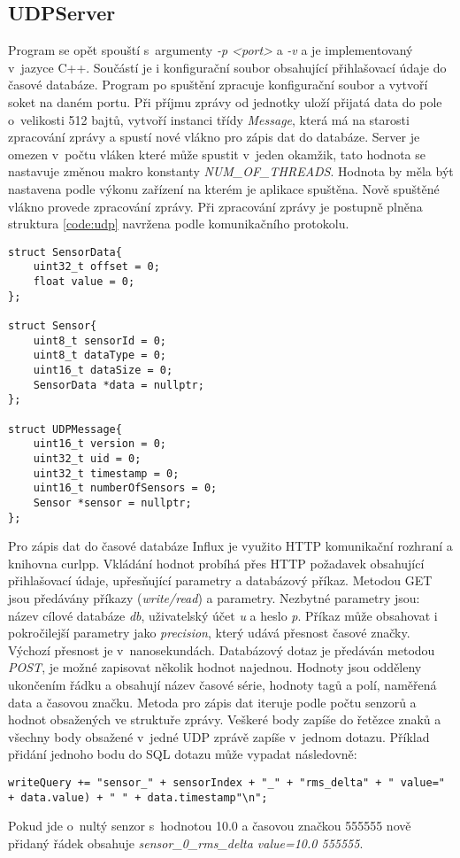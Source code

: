 \subsection{UDPServer}
Program se opět spouští s~argumenty \textit{-p <port>} a \textit{-v} a je implementovaný v~jazyce C++. Součástí je i konfigurační soubor obsahující přihlašovací údaje do časové databáze. Program po spuštění zpracuje konfigurační soubor a vytvoří soket na daném portu. Při příjmu zprávy od jednotky uloží přijatá data do pole o~velikosti 512 bajtů, vytvoří instanci třídy \textit{Message}, která má na starosti zpracování zprávy a spustí nové vlákno pro zápis dat do databáze. Server je omezen v~počtu vláken které může spustit v~jeden okamžik, tato hodnota se nastavuje změnou makro konstanty \textit{NUM\_OF\_THREADS}. Hodnota by měla být nastavena podle výkonu zařízení na kterém je aplikace spuštěna. Nově spuštěné vlákno provede zpracování zprávy. Při zpracování zprávy je postupně plněna struktura \ref{code:udp} navržena podle komunikačního protokolu.
\begin{lstlisting}[style=c++, caption={Struktura dat zpracovaných z~UDP zprávy.}, label={code:udp}]
struct SensorData{
    uint32_t offset = 0;
    float value = 0;
};

struct Sensor{
    uint8_t sensorId = 0;
    uint8_t dataType = 0;
    uint16_t dataSize = 0;
    SensorData *data = nullptr;
};

struct UDPMessage{
    uint16_t version = 0;
    uint32_t uid = 0;
    uint32_t timestamp = 0;
    uint16_t numberOfSensors = 0;
    Sensor *sensor = nullptr;
};
\end{lstlisting}
Pro zápis dat do časové databáze Influx je využito HTTP komunikační rozhraní a knihovna curlpp. Vkládání hodnot probíhá přes HTTP požadavek obsahující přihlašovací údaje, upřesňující parametry a databázový příkaz. Metodou GET jsou předávány příkazy (\textit{write/read}) a parametry. Nezbytné parametry jsou: název cílové databáze \textit{db}, uživatelský účet \textit{u} a heslo \textit{p}. Příkaz může obsahovat i pokročilejší parametry jako \textit{precision}, který udává přesnost časové značky. Výchozí přesnost je v~nanosekundách. Databázový dotaz je předáván metodou \textit{POST}, je možné zapisovat několik hodnot najednou. Hodnoty jsou odděleny ukončením řádku a obsahují název časové série, hodnoty tagů a polí, naměřená data a časovou značku. Metoda pro zápis dat iteruje podle počtu senzorů a hodnot obsažených ve struktuře zprávy. Veškeré body zapíše do řetězce znaků a všechny body obsažené v~jedné UDP zprávě zapíše v~jednom dotazu. Příklad přidání jednoho bodu do SQL dotazu může vypadat následovně:
\begin{lstlisting}[style=c++, breaklines, caption={Přidání jednoho bodu do databázového dotazu}, label={code:httpapi}]
writeQuery += "sensor_" + sensorIndex + "_" + "rms_delta" + " value=" + data.value) + " " + data.timestamp"\n";
\end{lstlisting}
Pokud jde o~nultý senzor s~hodnotou 10.0 a časovou značkou 555555 nově přidaný řádek obsahuje \textit{sensor\_0\_rms\_delta value=10.0 555555}.

